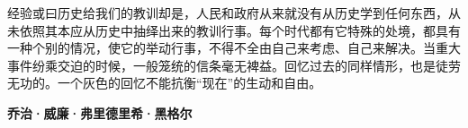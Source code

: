 \begin{dedications}

经验或曰历史给我们的教训却是，人民和政府从来就没有从历史学到任何东西，从未依照其本应从历史中抽绎出来的教训行事。每个时代都有它特殊的处境，都具有一种个别的情况，使它的举动行事，不得不全由自己来考虑、自己来解决。当重大事件纷乘交迫的时候，一般笼统的信条毫无裨益。回忆过去的同样情形，也是徒劳无功的。一个灰色的回忆不能抗衡“现在”的生动和自由。

  \vspace{\baselineskip} \raggedleft \Large \bfseries 乔治·威廉·弗里德里希·黑格尔
\end{dedications}
